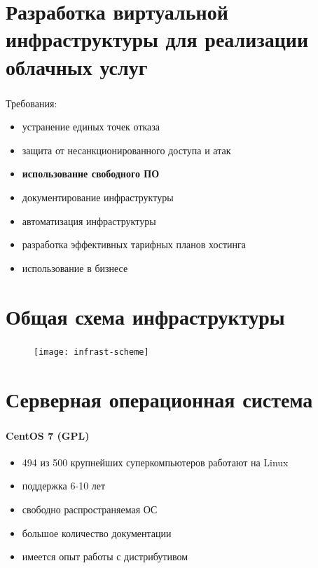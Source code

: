 
\frame[plain]{\titlepage} %


\section{Разработка виртуальной инфраструктуры для реализации облачных услуг}

\begin{frame}
\frametitle{\insertsection}
Требования:
\begin{itemize}
	\item устранение единых точек отказа
	\item защита от несанкционированного доступа и атак
	\item \textbf{использование свободного ПО}
	\item документирование инфраструктуры
	\item автоматизация инфраструктуры
	\item разработка эффективных тарифных планов хостинга
	\item использование в бизнесе
\end{itemize}
\end{frame}


\section{Общая схема инфраструктуры}

\begin{frame}
\frametitle{\insertsection}
\begin{figure}[h]
	\begin{center}
		\texttt{[image: infrast-scheme]}
	\end{center}
\end{figure}
\end{frame}


\section{Серверная операционная система}

\begin{frame}
\frametitle{\insertsection}
\framesubtitle{CentOS 7 (GPL)}
\begin{itemize}
	\item 494 из 500 крупнейших суперкомпьютеров работают на Linux
	\item поддержка 6-10 лет
	\item свободно распространяемая ОС
	\item большое количество документации
	\item имеется опыт работы с дистрибутивом
\end{itemize}
\end{frame}

